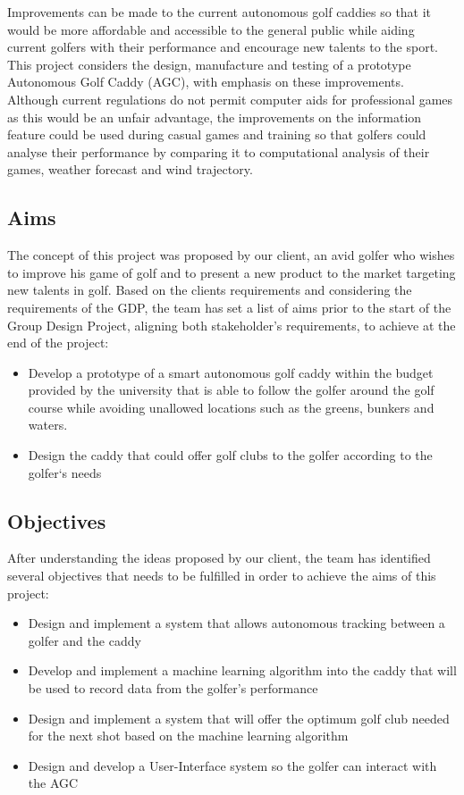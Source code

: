\documentclass[11pt,landscape]{article}
\begin{document}
\begin{multicols}{2}
Improvements can be made to the current autonomous golf caddies so that it would
be more affordable and accessible to the general public while aiding current
golfers with their performance and encourage new talents to the sport. This
project considers the design, manufacture and testing of a prototype Autonomous
Golf Caddy (AGC), with emphasis on these improvements. Although current
regulations do not permit computer aids for professional games as this would be
an unfair advantage, the improvements on the information feature could be used
during casual games and training so that golfers could analyse their performance
by comparing it to computational analysis of their games, weather forecast and
wind trajectory.  

\subsection{Aims}
The concept of this project was proposed by our client, an avid golfer who wishes
to improve his game of golf and to present a new product to the market
targeting new talents in golf. Based on the clients requirements and considering
the requirements of the GDP, the team has set a list of aims prior to the start
of the Group Design Project, aligning both stakeholder's requirements, to
achieve at the end of the project: 
\begin{itemize}
    \item Develop a prototype of a smart autonomous golf caddy within the budget
    provided by the university that is able to follow the golfer around the golf
    course while avoiding unallowed locations such as the greens, bunkers and
    waters. 
    \item Design the caddy that could offer golf clubs to the golfer according
    to the golfer`s needs 
\end{itemize}
\vfill\null
\columnbreak

\subsection{Objectives}
After understanding the ideas proposed by our client, the team has identified
several objectives that needs to be fulfilled in order to achieve the aims of
this project: 
\begin{itemize}
    \item Design and implement a system that allows autonomous tracking between
    a golfer and the caddy 
    \item Develop and implement a machine learning algorithm into the caddy that
    will be used to record data from the golfer’s performance 
    \item Design and implement a system that will offer the optimum golf club
    needed for the next shot based on the machine learning algorithm 
    \item Design and develop a User-Interface system so the golfer can interact
    with the AGC
\end{itemize}


\end{multicols}
\end{document}
